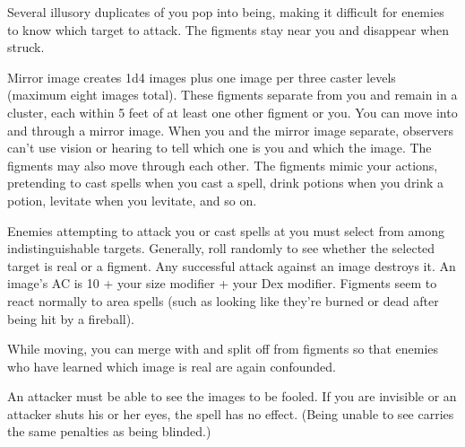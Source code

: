\begin{multicols}{2}
\begin{small}
\noindent Several illusory duplicates of you pop into being, making it difficult for enemies to know which target to attack. The figments stay near you and disappear when struck.

\smallskip\noindent Mirror image creates 1d4 images plus one image per three caster levels (maximum eight images total). These figments separate from you and remain in a cluster, each within 5 feet of at least one other figment or you. You can move into and through a mirror image. When you and the mirror image separate, observers can't use vision or hearing to tell which one is you and which the image. The figments may also move through each other. The figments mimic your actions, pretending to cast spells when you cast a spell, drink potions when you drink a potion, levitate when you levitate, and so on.

\smallskip\noindent Enemies attempting to attack you or cast spells at you must select from among indistinguishable targets. Generally, roll randomly to see whether the selected target is real or a figment. Any successful attack against an image destroys it. An image's AC is 10 + your size modifier + your Dex modifier. Figments seem to react normally to area spells (such as looking like they're burned or dead after being hit by a fireball).

\smallskip\noindent While moving, you can merge with and split off from figments so that enemies who have learned which image is real are again confounded.

\smallskip\noindent An attacker must be able to see the images to be fooled. If you are invisible or an attacker shuts his or her eyes, the spell has no effect. (Being unable to see carries the same penalties as being blinded.)


\end{small}
\end{multicols}
